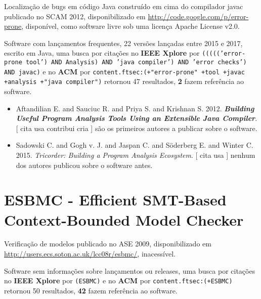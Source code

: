 Localização de bugs em código Java construído em cima do compilador javac
publicado no SCAM 2012,
disponibilizado em \url{http://code.google.com/p/error-prone},
disponível,
como software livre
sob uma licença Apache License v2.0.

Software com lançamentos frequentes,
22 versões lançadas
entre 2015 e 2017,
escrito em Java,
uma busca por citações no {\bf IEEE Xplore} por
\texttt{((((('error-prone tool') AND Analysis) AND 'java compiler') AND 'error checks') AND javac)}
e no {\bf ACM} por
\texttt{content.ftsec:(+"error-prone" +tool +javac +analysis +"java compiler")}
retornou
47 resultados,
{\bf 2} fazem referência ao software.

\begin{itemize}
\item Aftandilian E. and Sauciuc R. and Priya S. and Krishnan S.
      2012.
        \textbf{\textit{ Building Useful Program Analysis Tools Using an Extensible Java Compiler}}.
      [
          cita
          usa
          contribui
          cria
      ]
são os primeiros autores a publicar sobre o software.
\item Sadowski C. and Gogh v. J. and Jaspan C. and Söderberg E. and Winter C.
      2015.
        \textit{ Tricorder: Building a Program Analysis Ecosystem}.
      [
          cita
          usa
      ]
nenhum dos autores publicou sobre o software antes.
\end{itemize}
\section{ESBMC - Efficient SMT-Based Context-Bounded Model Checker}

Verificação de modelos
publicado no ASE 2009,
disponibilizado em \url{http://users.ecs.soton.ac.uk/lcc08r/esbmc/},
inacessível.

Software sem informações sobre lançamentos ou releases,
uma busca por citações no {\bf IEEE Xplore} por
\texttt{(ESBMC)}
e no {\bf ACM} por
\texttt{content.ftsec:(+ESBMC)}
retornou
50 resultados,
{\bf 42} fazem referência ao software.


